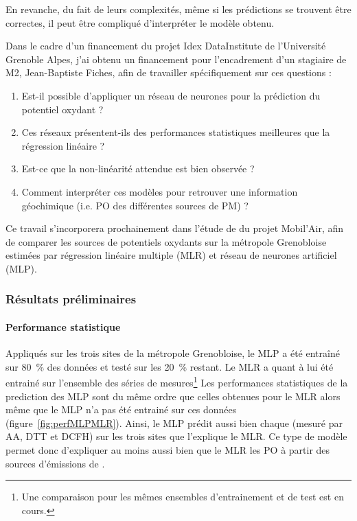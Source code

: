 En revanche, du fait de leurs complexités, même si les prédictions se trouvent être
correctes, il peut être compliqué d'interpréter le modèle obtenu.


Dans le cadre d'un financement du projet Idex DataInstitute de l'Université Grenoble Alpes, j'ai
obtenu un financement pour l'encadrement d'un stagiaire de M2, Jean-Baptiste Fiches, afin
de travailler spécifiquement sur ces questions :
\begin{enumerate}
    \item Est-il possible d'appliquer un réseau de neurones pour la prédiction du potentiel
        oxydant ?
    \item Ces réseaux présentent-ils des performances statistiques meilleures que la
        régression linéaire ?
    \item Est-ce que la non-linéarité attendue est bien observée ?
    \item Comment interpréter ces modèles pour retrouver une information géochimique (i.e.
        PO des différentes sources de PM) ?
\end{enumerate}
Ce travail s'incorporera prochainement dans l'étude de \cite{borlazaUrbaninprep.} du
projet Mobil'Air, afin de comparer les sources de potentiels oxydants sur la
métropole Grenobloise estimées par régression linéaire multiple (MLR) et réseau de
neurones artificiel (MLP).


\subsubsection{Résultats préliminaires}%
\label{ssub:résultats_préliminaires}

\paragraph{Performance statistique}%
\label{par:performance_statistique}

Appliqués sur les trois sites de la métropole Grenobloise, le MLP a été entraîné sur
\SI{80}{\percent} des données et testé sur les \SI{20}{\percent} restant. Le MLR a quant à
lui été entrainé sur l'ensemble des séries de mesures\footnote{Une comparaison pour les mêmes
ensembles d'entrainement et de test est en cours.}
Les performances statistiques de la prediction des MLP sont du même ordre que celles
obtenues pour le MLR alors même que le MLP n'a pas été entrainé sur ces données (figure~\ref{fig:perfMLPMLR}).
Ainsi, le MLP prédit aussi bien chaque \POv{}
(mesuré par AA, DTT et DCFH) sur les trois sites que l'explique le MLR.
Ce type de modèle permet donc d'expliquer au moins aussi bien que le MLR les PO à partir
des sources d'émissions de \PMdix.

